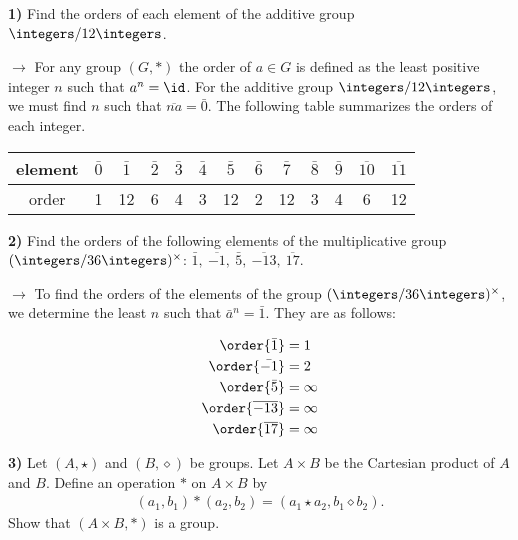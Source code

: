 \documentclass[12pt,a4paper]{article}
\newcommand{\prob}[2]{\textbf{#1)} #2}
\begin{document}
\prob{1}{Find the orders of each element of the additive group $\integers/12\integers$.}

$\rightarrow$ For any group $(G,*)$ the order of $a \in G$ is defined as the least positive integer $n$ such that $a^n = \id$. For the additive group $\integers/12\integers$, we must find $n$ such that $\overline{na} = \bar{0}$. The following table summarizes the orders of each integer.

\begin{table}[H]
\begin{center}
\begin{tabular}{|c|c|c|c|c|c|c|c|c|c|c|c|c|}
\hline
element & $\bar{0}$ & $\bar{1}$ & $\bar{2}$ & $\bar{3}$ & $\bar{4}$ & $\bar{5}$ & $\bar{6}$ & $\bar{7}$ & $\bar{8}$ & $\bar{9}$ & $\overline{10}$ & $\overline{11}$ \\
\hline
order & 1 & 12 & 6 & 4 & 3 & 12 & 2 & 12 & 3 & 4 & 6 & 12 \\
\hline
\end{tabular}
\end{center}
\end{table}

\prob{2}{Find the orders of the following elements of the multiplicative group $(\integers/36\integers)^{\times}$: $\bar{1},~\overline{-1},~\bar{5},~\overline{-13},~\overline{17}$.}

$\rightarrow$ To find the orders of the elements of the group $(\integers/36\integers)^{\times}$, we determine the least $n$ such that $\bar{a}^n = \bar{1}$. They are as follows:

\begin{align*}
\order{\bar{1}} &= 1 \\
\order{\bar{-1}} &= 2 \\
\order{\bar{5}} &= \infty \\
\order{\overline{-13}} &= \infty \\
\order{\overline{17}} &= \infty 
\end{align*}

\prob{3}{Let $(A,\star)$ and $(B,\diamond)$ be groups. Let $A \times B$ be the Cartesian product of $A$ and $B$. Define an operation $*$ on $A \times B$ by
\begin{align*}
(a_1,b_1) * (a_2,b_2) = (a_1 \star a_2, b_1 \diamond b_2).
\end{align*}
Show that $(A \times B,*)$ is a group.}
\end{document}

